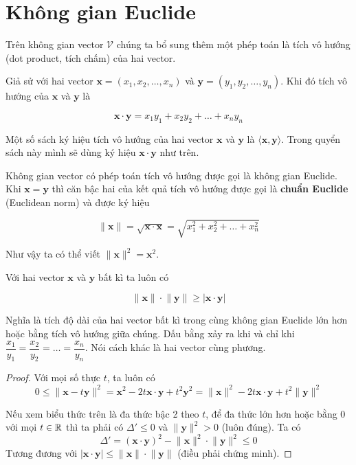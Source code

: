 \section{Không gian Euclide}

Trên không gian vector $\mathcal{V}$ chúng ta bổ sung thêm một phép toán là tích vô hướng (dot product, tích chấm) của hai vector.

Giả sử với hai vector $\bm{x} = (x_1, x_2, \ldots, x_n)$ và $\bm{y} = (y_1, y_2, \ldots, y_n)$. Khi đó tích vô hướng của $\bm{x}$ và $\bm{y}$ là

\begin{equation}
	\bm{x} \cdot \bm{y} = x_1 y_1 + x_2 y_2 + \ldots + x_n y_n
\end{equation}

Một số sách ký hiệu tích vô hướng của hai vector $\bm{x}$ và $\bm{y}$ là $\langle \bm{x}, \bm{y} \rangle$. Trong quyển sách này mình sẽ dùng ký hiệu $\bm{x} \cdot \bm{y}$ như trên.

Không gian vector có phép toán tích vô hướng được gọi là không gian Euclide. Khi $\bm{x} = \bm{y}$ thì căn bậc hai của kết quả tích vô hướng được gọi là \textbf{chuẩn Euclide} (Euclidean norm) và được ký hiệu

\begin{equation}
	\lVert \bm{x} \rVert = \sqrt{\bm{x} \cdot \bm{x}} = \sqrt{x_1^2 + x_2^2 + \ldots + x_n^2}
\end{equation}

Như vậy ta có thể viết $\lVert \bm{x} \rVert^2 = \bm{x}^2$.

\begin{theorem}
	Với hai vector $\bm{x}$ và $\bm{y}$ bất kì ta luôn có
	
	\begin{equation}
		\lVert \bm{x} \rVert \cdot \lVert \bm{y} \rVert \geqslant \lvert \bm{x} \cdot \bm{y} \rvert
	\end{equation}
	
	Nghĩa là tích độ dài của hai vector bất kì trong cùng không gian Euclide lớn hơn hoặc bằng tích vô hướng giữa chúng. Dấu bằng xảy ra khi và chỉ khi $\dfrac{x_1}{y_1} = \dfrac{x_2}{y_2} = \ldots = \dfrac{x_n}{y_n}$. Nói cách khác là hai vector cùng phương.
\end{theorem}

\begin{proof}
	Với mọi số thực $t$, ta luôn có 
	\[0 \leqslant \lVert \bm{x} - t \bm{y} \rVert^2 = \bm{x}^2 - 2 t \bm{x} \cdot \bm{y} + t^2 \bm{y}^2 = \lVert \bm{x} \rVert^2 - 2 t \bm{x} \cdot \bm{y} + t^2 \lVert \bm{y} \rVert^2 \]
	
	Nếu xem biểu thức trên là đa thức bậc 2 theo $t$, để đa thức lớn hơn hoặc bằng 0 với mọi $t \in \mathbb{R}$ thì ta phải có $\Delta' \leqslant 0$ và $\lVert \bm{y} \rVert^2 > 0$ (luôn đúng). Ta có
	\[\Delta' = (\bm{x} \cdot \bm{y})^2 - \lVert \bm{x} \rVert^2 \cdot \lVert \bm{y} \rVert^2 \leqslant 0 \]
	Tương đương với $\lvert \bm{x} \cdot \bm{y} \rvert \leqslant \lVert \bm{x} \rVert \cdot \lVert \bm{y} \rVert$ (điều phải chứng minh).
\end{proof}

